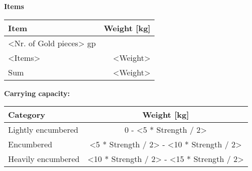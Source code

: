 \documentclass[11pt]{article}
\begin{document}
\clearpage

	\begin{center}
{\LARGE \textbf{Items}}
	\end{center}

	\begin{tabularx}{\textwidth}{X|r}
Item & Weight [kg] \\
\hline
<Nr. of Gold pieces> gp 					& 			\\
<Items> \dotfill 							& <Weight> 	\\
\hline
Sum 										& <Weight>
	\end{tabularx}

\vspace{10mm}

\textbf{Carrying capacity:} \\

	\begin{tabular}{l|c}
Category & Weight [kg] \\
\hline
Lightly encumbered 	& 0 - <5 * Strength / 2> 	\\
Encumbered 			& <5 * Strength / 2> - <10 * Strength / 2> \\
Heavily encumbered	& <10 * Strength / 2> - <15 * Strength / 2>
	\end{tabular}
\end{document}
